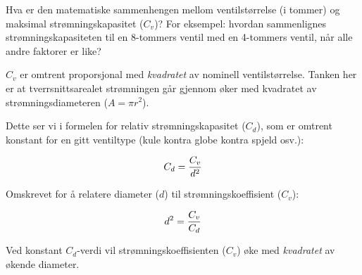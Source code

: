 

Hva er den matematiske sammenhengen mellom ventilstørrelse (i tommer) og maksimal strømningskapasitet ($C_v$)? For eksempel: hvordan sammenlignes strømningskapasiteten til en 8-tommers ventil med en 4-tommers ventil, når alle andre faktorer er like?







$C_v$ er omtrent proporsjonal med {\it kvadratet} av nominell ventilstørrelse. Tanken her er at tverrsnittsarealet strømningen går gjennom øker med kvadratet av strømningsdiameteren ($A = \pi r^2$).

Dette ser vi i formelen for relativ strømningskapasitet ($C_d$), som er omtrent konstant for en gitt ventiltype (kule kontra globe kontra spjeld osv.):

$$C_d = {C_v \over d^2}$$

Omskrevet for å relatere diameter ($d$) til strømningskoeffisient ($C_v$):

$$d^2 = {C_v \over C_d}$$

Ved konstant $C_d$-verdi vil strømningskoeffisienten ($C_v$) øke med {\it kvadratet} av økende diameter.










